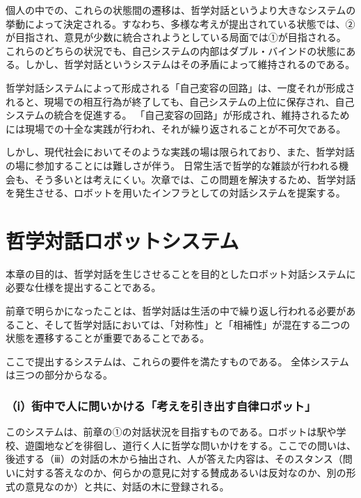 \documentclass[9pt,b5j,twoside,twocolumn]{utarticle}
\begin{document}
個人の中での、これらの状態間の遷移は、哲学対話というより大きなシステムの挙動によって決定される。すなわち、多様な考えが提出されている状態では、②が目指され、意見が少数に統合されようとしている局面では①が目指される。
これらのどちらの状況でも、自己システムの内部はダブル・バインドの状態にある。しかし、哲学対話というシステムはその矛盾によって維持されるのである。


哲学対話システムによって形成される「自己変容の回路」は、一度それが形成されると、現場での相互行為が終了しても、自己システムの上位に保存され、自己システムの統合を促進する。
「自己変容の回路」が形成され、維持されるためには現場での十全な実践が行われ、それが繰り返されることが不可欠である。


しかし、現代社会においてそのような実践の場は限られており、また、哲学対話の場に参加することには難しさが伴う。
日常生活で哲学的な雑談が行われる機会も、そう多いとは考えにくい。次章では、この問題を解決するため、哲学対話を発生させる、ロボットを用いたインフラとしての対話システムを提案する。

\section{哲学対話ロボットシステム}
本章の目的は、哲学対話を生じさせることを目的としたロボット対話システムに必要な仕様を提出することである。





前章で明らかになったことは、哲学対話は生活の中で繰り返し行われる必要があること、そして哲学対話においては、「対称性」と「相補性」が混在する二つの状態を遷移することが重要であることである。


ここで提出するシステムは、これらの要件を満たすものである。
全体システムは三つの部分からなる。
\subsubsection*{（ⅰ）街中で人に問いかける「考えを引き出す自律ロボット」}
このシステムは、前章の①の対話状況を目指すものである。ロボットは駅や学校、遊園地などを徘徊し、道行く人に哲学な問いかけをする。ここでの問いは、後述する（ⅲ）の対話の木から抽出され、人が答えた内容は、そのスタンス（問いに対する答えなのか、何らかの意見に対する賛成あるいは反対なのか、別の形式の意見なのか）と共に、対話の木に登録される。
\end{document}
